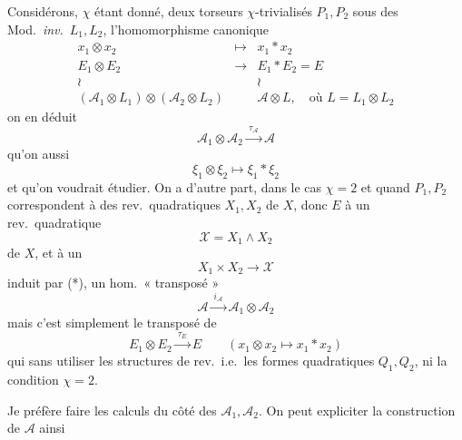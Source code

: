 \documentclass[11pt,a4paper]{article}
\begin{document}
Considérons, $\chi$ étant donné, deux torseurs $\chi$-trivialisés  $P_1, P_2$ sous des Mod.\ \emph{inv.}\ $L_1, L_2$, l'homomorphisme canonique
\[
  \begin{array}{ccc}
    x_1 \otimes x_2 & \longmapsto & x_1 * x_2 \\
    E_1 \otimes E_2 & \longrightarrow & E_1 * E_2 = E \\
    \wr & & \wr \\
    (\mathcal{A}_1 \otimes L_1) \otimes (\mathcal{A}_2 \otimes L_2) & & \mathcal{A} \otimes L , \quad \text{où } L = L_1 \otimes L_2
  \end{array}
\]
on en déduit
\[
  \mathcal{A}_1 \otimes \mathcal{A}_2 \xrightarrow{\ \tau_{\mathcal{A}}\ } \mathcal{A}
\]
qu'on  aussi 
\[
  \xi_1 \otimes \xi_2 \longmapsto \xi_1 * \xi_2
\]
et qu'on voudrait étudier. On a d'autre part, dans le cas $\chi = 2$ et quand $P_1, P_2$ \struck{\ill{}} correspondent à des rev.\ quadratiques $X_1, X_2$ de $X$, donc $E$ à un rev.\ quadratique
\[
  \mathcal{X} = X_1 \wedge X_2
\]
de $X$, et à un \ill{}
\[
  X_1 \times X_2 \longrightarrow \mathcal{X}
\]
induit par (*), un hom.\ « transposé »
\[
  \mathcal{A} \xrightarrow{\ i_{\mathcal{A}}\ } \mathcal{A}_1 \otimes \mathcal{A}_2
\]
mais c'est simplement le transposé de
\[
  E_1 \otimes E_2 \xrightarrow{\ \tau_E\ } E \qquad (x_1 \otimes x_2 \mapsto x_1 * x_2)
\]
qui  \struck{\ill{}} \ill{} sans utiliser les structures de rev.\ i.e.\ les formes quadratiques $Q_1, Q_2$, ni la condition $\chi = 2$.

Je préfère faire les calculs du côté des $\mathcal{A}_1, \mathcal{A}_2$. On peut expliciter la construction de $\mathcal{A}$ ainsi

\end{document}
